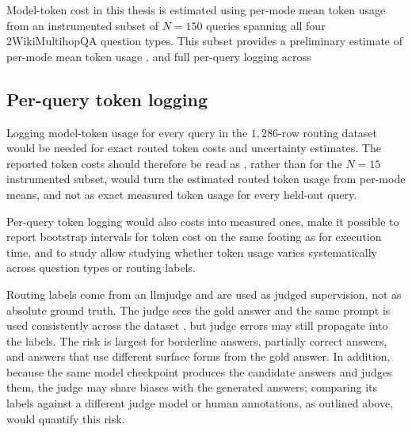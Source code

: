 \documentclass[english, bibtex]{kththesis}               %
\numberwithin{listing}{chapter}
\providecommand{\DIFaddtex}[1]{{\protect\color{blue} \sf #1}} %
\providecommand{\DIFdeltex}[1]{{\protect\color{red} \scriptsize #1}} %
\providecommand{\DIFaddbegin}{} %
\providecommand{\DIFaddend}{} %
\providecommand{\DIFdelbegin}{} %
\providecommand{\DIFdelend}{} %
\providecommand{\DIFadd}[1]{\texorpdfstring{\DIFaddtex{#1}}{#1}} %
\providecommand{\DIFdel}[1]{\texorpdfstring{\DIFdeltex{#1}}{}} %
\begin{document}
\DIFdelbegin \DIFdel{Model-token cost in this thesis is estimated using per-mode mean token usage from an instrumented subset of \(N = 150\) queries spanning all four 2WikiMultihopQA question types.
This subset provides a preliminary estimate of per-mode mean token usage , and full per-query logging across }\DIFdelend \DIFaddbegin \subsection{Per-query token logging} \DIFadd{Logging model-token usage for every query in }\DIFaddend the $1{,}286$-row routing dataset\DIFdelbegin \DIFdel{would be needed for exact routed token costs and uncertainty estimates. The reported token costs should therefore be read as }\DIFdelend \DIFaddbegin \DIFadd{, rather than for the $N = 15$ instrumented subset, would turn the }\DIFaddend estimated routed token \DIFdelbegin \DIFdel{usage from per-mode means, and not as exact measured token usage for every held-out query.
}%

\DIFdel{Per-query token logging would also }\DIFdelend \DIFaddbegin \DIFadd{costs into measured ones, }\DIFaddend make it possible to report bootstrap intervals for token cost on the same footing as for execution time, and \DIFdelbegin \DIFdel{to study }\DIFdelend \DIFaddbegin \DIFadd{allow studying }\DIFaddend whether token usage varies systematically across question types or routing labels.

\DIFdelbegin %

\DIFdel{Routing labels come from an \gls{llmjudge} and are used as judged supervision, not as absolute ground truth. The judge sees the gold answer and the same prompt is used consistently across the dataset \cite{zheng2023judge}, but judge errors may still propagate into the labels. The risk is largest for borderline answers, partially correct answers, and answers that use different surface forms from the gold answer. In addition, because the same model checkpoint produces the candidate answers and judges them, the judge may share biases with the generated answers; comparing its labels against a different judge model or human annotations, as outlined above, would quantify this risk.
}%
\end{document}
